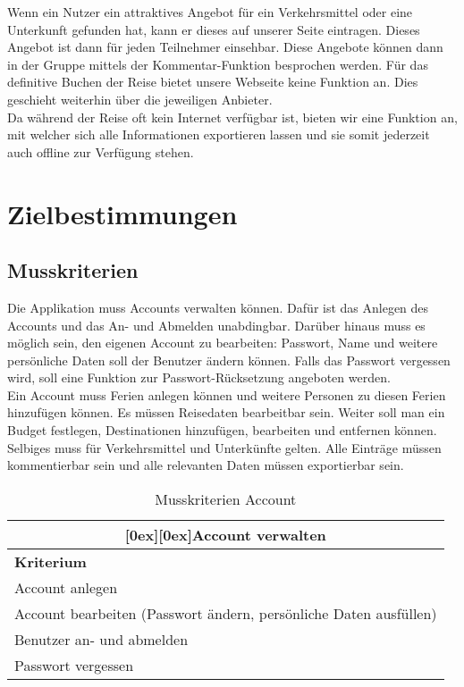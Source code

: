 \documentclass[10pt,a4paper,titlepage,twoside,german,final]{zhawreprt}
\newcommand{\tableheader}[2]{\multicolumn{#1}{c}{\raisebox{-0.3em}[0ex][0ex]{\large{\textbf{#2}}}}}
\numberwithin{table}{chapter}
\begin{document}
Wenn ein Nutzer ein attraktives Angebot für ein Verkehrsmittel oder eine Unterkunft gefunden hat, kann er dieses auf unserer Seite eintragen. Dieses Angebot ist dann für jeden Teilnehmer einsehbar. Diese Angebote können dann in der Gruppe mittels der Kommentar-Funktion besprochen werden. Für das definitive Buchen der Reise bietet unsere Webseite keine Funktion an. Dies geschieht weiterhin über die jeweiligen Anbieter.\\
Da während der Reise oft kein Internet verfügbar ist, bieten wir eine Funktion an, mit welcher sich alle Informationen exportieren lassen und sie somit jederzeit auch offline zur Verfügung stehen.

\chapter{Zielbestimmungen}\label{chp:DefinitionOfGoals}
\section{Musskriterien}\label{sec:MustCriteria}
Die Applikation muss Accounts verwalten können. Dafür ist das Anlegen des Accounts und das An- und Abmelden unabdingbar. Darüber hinaus muss es möglich sein, den eigenen Account zu bearbeiten: Passwort, Name und weitere persönliche Daten soll der Benutzer ändern können. Falls das Passwort vergessen wird, soll eine Funktion zur Passwort-Rücksetzung angeboten werden.\\
Ein Account muss Ferien anlegen können und weitere Personen zu diesen Ferien hinzufügen können. Es müssen Reisedaten bearbeitbar sein. Weiter soll man ein Budget festlegen, Destinationen hinzufügen, bearbeiten und entfernen können. Selbiges muss für Verkehrsmittel und Unterkünfte gelten. Alle Einträge müssen kommentierbar sein und alle relevanten Daten müssen exportierbar sein.
\begin{table}[ht]\centering
\begin{tabular}{l}\hline
\tableheader{1}{Account verwalten}\\[0.3em]\hline
\textbf{Kriterium}\\\hline
Account anlegen\\\hline
Account bearbeiten (Passwort ändern, persönliche Daten ausfüllen)\\\hline
Benutzer an- und abmelden\\\hline
Passwort vergessen\\\hline
\end{tabular}
\caption{Musskriterien Account}\label{tbl:MustAccount}
\end{table}
\end{document}
